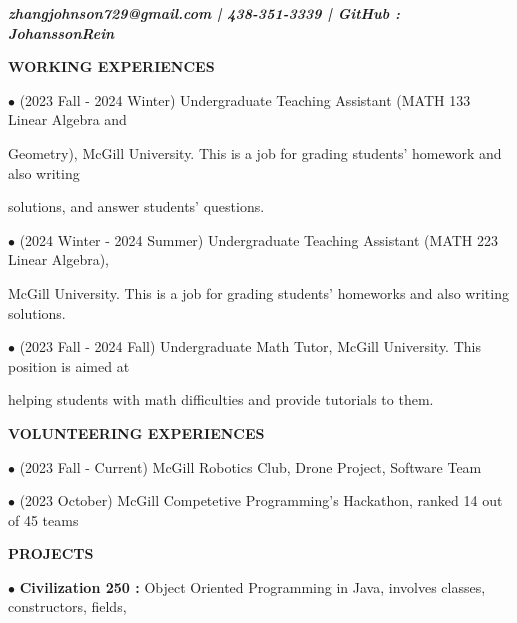 \documentclass[12pt]{article}
\begin{document}
\begin{center}
    
    
    \hrulefill
    \vspace*{0.2cm}
    
    \textbf{\textit{zhangjohnson729@gmail.com | 438-351-3339 | GitHub : JohanssonRein}}
\end{center}

\vspace*{0.3cm}
\textbf{WORKING EXPERIENCES}

\vspace*{0.3cm}
$\bullet$ (2023 Fall - 2024 Winter) Undergraduate 
Teaching Assistant (MATH 133 Linear Algebra and 

\hspace*{0.25cm}
Geometry), McGill University. This is a 
job for grading students' homework and also writing 

\hspace*{0.25cm}
solutions, and answer students' questions.

\vspace*{0.2cm}
$\bullet$ (2024 Winter - 2024 Summer) Undergraduate 
Teaching Assistant (MATH 223 Linear Algebra),  

\hspace*{0.25cm}
McGill University. This is a job for grading students' homeworks and
also writing solutions.

\vspace*{0.2cm}
$\bullet$ (2023 Fall - 2024 Fall) Undergraduate Math Tutor, 
McGill University. This position is aimed at 

\hspace*{0.2cm}
helping students 
with math difficulties and provide tutorials to them.


\vspace*{0.3cm}
\textbf{VOLUNTEERING EXPERIENCES}

\vspace*{0.3cm}
$\bullet$ (2023 Fall - Current) McGill Robotics Club, Drone 
Project, Software Team 


$\bullet$ (2023 October) McGill Competetive Programming's 
Hackathon, ranked 14 out of 45 teams

\vspace*{0.3cm}
\textbf{PROJECTS}

\vspace*{0.3cm}
$\bullet$ \textbf{Civilization 250 : } Object Oriented Programming in Java,
involves classes, constructors, fields, 
\end{document}
